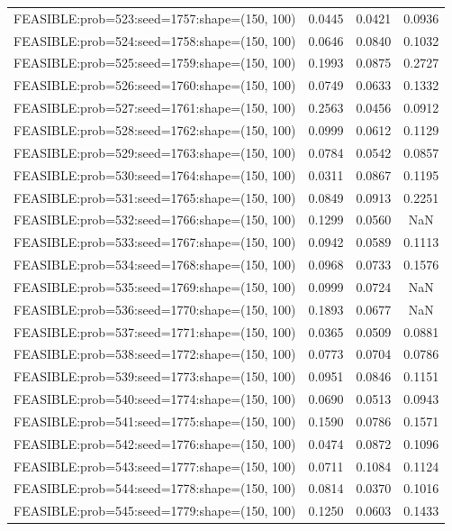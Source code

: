 \begin{longtable}{lccc}
FEASIBLE:prob=523:seed=1757:shape=(150, 100) & 0.0445 & 0.0421 & 0.0936 \\
FEASIBLE:prob=524:seed=1758:shape=(150, 100) & 0.0646 & 0.0840 & 0.1032 \\
FEASIBLE:prob=525:seed=1759:shape=(150, 100) & 0.1993 & 0.0875 & 0.2727 \\
FEASIBLE:prob=526:seed=1760:shape=(150, 100) & 0.0749 & 0.0633 & 0.1332 \\
FEASIBLE:prob=527:seed=1761:shape=(150, 100) & 0.2563 & 0.0456 & 0.0912 \\
FEASIBLE:prob=528:seed=1762:shape=(150, 100) & 0.0999 & 0.0612 & 0.1129 \\
FEASIBLE:prob=529:seed=1763:shape=(150, 100) & 0.0784 & 0.0542 & 0.0857 \\
FEASIBLE:prob=530:seed=1764:shape=(150, 100) & 0.0311 & 0.0867 & 0.1195 \\
FEASIBLE:prob=531:seed=1765:shape=(150, 100) & 0.0849 & 0.0913 & 0.2251 \\
FEASIBLE:prob=532:seed=1766:shape=(150, 100) & 0.1299 & 0.0560 &    NaN \\
FEASIBLE:prob=533:seed=1767:shape=(150, 100) & 0.0942 & 0.0589 & 0.1113 \\
FEASIBLE:prob=534:seed=1768:shape=(150, 100) & 0.0968 & 0.0733 & 0.1576 \\
FEASIBLE:prob=535:seed=1769:shape=(150, 100) & 0.0999 & 0.0724 &    NaN \\
FEASIBLE:prob=536:seed=1770:shape=(150, 100) & 0.1893 & 0.0677 &    NaN \\
FEASIBLE:prob=537:seed=1771:shape=(150, 100) & 0.0365 & 0.0509 & 0.0881 \\
FEASIBLE:prob=538:seed=1772:shape=(150, 100) & 0.0773 & 0.0704 & 0.0786 \\
FEASIBLE:prob=539:seed=1773:shape=(150, 100) & 0.0951 & 0.0846 & 0.1151 \\
FEASIBLE:prob=540:seed=1774:shape=(150, 100) & 0.0690 & 0.0513 & 0.0943 \\
FEASIBLE:prob=541:seed=1775:shape=(150, 100) & 0.1590 & 0.0786 & 0.1571 \\
FEASIBLE:prob=542:seed=1776:shape=(150, 100) & 0.0474 & 0.0872 & 0.1096 \\
FEASIBLE:prob=543:seed=1777:shape=(150, 100) & 0.0711 & 0.1084 & 0.1124 \\
FEASIBLE:prob=544:seed=1778:shape=(150, 100) & 0.0814 & 0.0370 & 0.1016 \\
FEASIBLE:prob=545:seed=1779:shape=(150, 100) & 0.1250 & 0.0603 & 0.1433 \\

\end{longtable}
